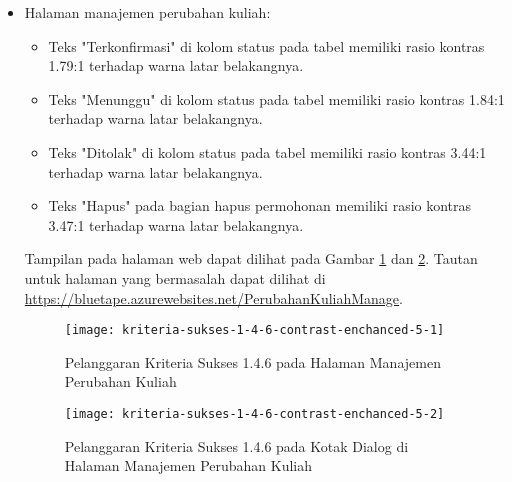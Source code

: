 \begin{itemize}
    \item Halaman manajemen perubahan kuliah: 
    \begin{itemize}
        \item Teks "Terkonfirmasi" di kolom status pada tabel memiliki rasio kontras 1.79:1 terhadap warna latar belakangnya.
        \item Teks "Menunggu" di kolom status pada tabel memiliki rasio kontras 1.84:1 terhadap warna latar belakangnya.
        \item Teks "Ditolak" di kolom status pada tabel memiliki rasio kontras 3.44:1 terhadap warna latar belakangnya.
        \item Teks "Hapus" pada bagian hapus permohonan memiliki rasio kontras 3.47:1 terhadap warna latar belakangnya.
    \end{itemize}
    Tampilan pada halaman web dapat dilihat pada Gambar \ref{fig:1.4.6_contrast_enchanced_5_1} dan \ref{fig:1.4.6_contrast_enchanced_5_2}. Tautan untuk halaman yang bermasalah dapat dilihat di \url{https://bluetape.azurewebsites.net/PerubahanKuliahManage}.
    \begin{figure}[H]
        \centering  
        \texttt{[image: kriteria-sukses-1-4-6-contrast-enchanced-5-1]}  
        \caption[Pelanggaran Kriteria Sukses 1.4.6 pada Halaman Manajemen Perubahan Kuliah]{Pelanggaran Kriteria Sukses 1.4.6 pada Halaman Manajemen Perubahan Kuliah}
        \label{fig:1.4.6_contrast_enchanced_5_1}  
    \end{figure} 
    
    \begin{figure}[H]
        \centering  
        \texttt{[image: kriteria-sukses-1-4-6-contrast-enchanced-5-2]}  
        \caption[Pelanggaran Kriteria Sukses 1.4.6 pada Kotak Dialog di Halaman Manajemen Perubahan Kuliah]{Pelanggaran Kriteria Sukses 1.4.6 pada Kotak Dialog di Halaman Manajemen Perubahan Kuliah}
        \label{fig:1.4.6_contrast_enchanced_5_2}  
    \end{figure}


\end{itemize}

